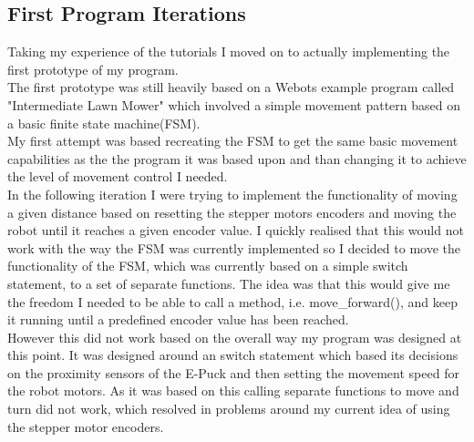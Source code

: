 \documentclass[10pt,a4paper]{article}
\begin{document}
\begin{flushleft}
\subsection{First Program Iterations}
Taking my experience of the tutorials I moved on to actually implementing the first prototype of my program. \\
The first prototype was still heavily based on a Webots example program called "Intermediate Lawn Mower" which involved a simple movement pattern based on a basic finite state machine(FSM). \\ My first attempt was based recreating the FSM to get the same basic movement capabilities as the the program it was based upon and than changing it to achieve the level of movement control I needed. \\[3ex]

In the following iteration I were trying to implement the functionality of moving a given distance based on resetting the stepper motors encoders and moving the robot until it reaches a given encoder value. I quickly realised that this would not work with the way the FSM was currently implemented so I decided to move the functionality of the FSM, which was currently based on a simple switch statement, to a set of separate functions. The idea was that this would give me the freedom I needed to be able to call a method, i.e. move\_forward(),  and keep it running until a predefined encoder value has been reached. \\
However this did not work based on the overall way my program was designed at this point. It was designed around an switch statement which based its decisions on the proximity sensors of the E-Puck and then setting the movement speed for the robot motors. As it was based on this calling separate functions to move and turn did not work, which resolved in problems around my current idea of using the stepper motor encoders. \\[3ex] 


\end{flushleft}
\end{document}
